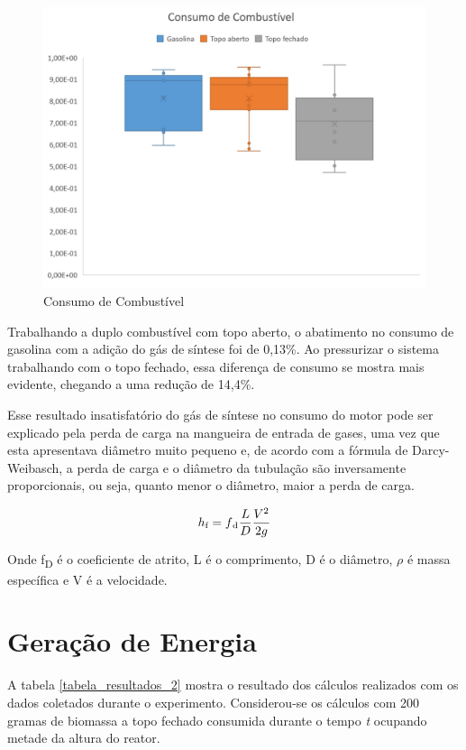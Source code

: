 \begin{figure}[!htb]
	\centering
	\includegraphics{Figuras/consumo_combustivel}
	\caption{Consumo de Combustível}
	\label{grafico_consumo}
\end{figure}

Trabalhando a duplo combustível com topo aberto, o abatimento no consumo de gasolina  com a adição do gás de síntese foi de 0,13\%. Ao pressurizar o sistema trabalhando com o topo fechado, essa diferença de consumo se mostra mais evidente, chegando a uma redução de 14,4\%.

Esse resultado insatisfatório do gás de síntese no consumo do motor pode ser explicado pela perda de carga na mangueira de entrada de gases, uma vez que esta apresentava diâmetro muito pequeno e, de acordo com a fórmula de Darcy-Weibasch, a perda de carga e o diâmetro da tubulação são inversamente proporcionais, ou seja, quanto menor o diâmetro, maior a perda de carga.

\begin{equation} \label{darcy-weibasch}
 h\textsubscript{f} = f\textsubscript{d}\frac{L}{D}\frac{V^2}{2g}
\end{equation}

Onde f\textsubscript{D} é o coeficiente de atrito, L é o comprimento, D é o diâmetro, $\rho$ é massa específica e V é a velocidade.

\section{Geração de Energia}

A tabela \ref{tabela_resultados_2} mostra o resultado dos cálculos realizados com os dados coletados durante o experimento. Considerou-se os cálculos com 200 gramas de biomassa a topo fechado consumida durante o tempo \textit{t} ocupando metade da altura do reator.

